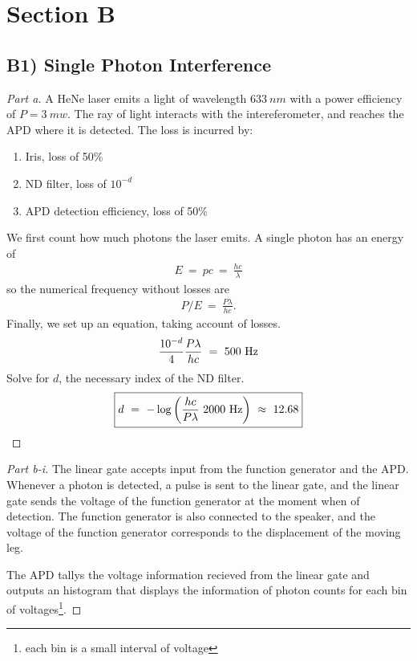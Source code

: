 \documentclass{article}
\numberwithin{equation}{section}
\begin{document}
\section{Section B}
\subsection*{B1) Single Photon Interference}
\begin{proof}
    [Part a] 
    A HeNe laser emits a light of wavelength $633\ nm$ with a power efficiency of 
    $P = 3\ mw$. The ray of light interacts with the intereferometer, 
    and reaches the APD where it is detected. The loss is 
    incurred by: 
    \begin{enumerate}
        \item Iris, loss of 50\% 
        \item ND filter, loss of $10^{-d}$ 
        \item APD detection efficiency, loss of 50\%
    \end{enumerate}

    We first count how much photons the laser emits. A single 
    photon has an energy of 
    \begin{align}
        E \ = \ pc \ = \ \frac {hc} \lambda
    \end{align}
    so the numerical frequency without losses are 
    \begin{align}
        P/E \ = \ \frac {P \lambda}{hc}.
    \end{align}
    Finally, we set up an equation, taking account of losses. 
    \begin{align}
        \frac {10^{-d}}{4} \frac {P \lambda}{hc} \ = \ 500 \ \rm Hz
    \end{align}
    Solve for $d$, the necessary index of the ND filter. 
    \begin{align}
        \boxed{
        d \ = \ -\log\left(
            \frac {hc}{P \lambda} \  2000 \ \rm Hz
        \right) \ \approx \ 12.68
        }
    \end{align}
\end{proof}

\begin{proof}[Part b-i]
    The linear gate accepts input from the 
    function generator and the APD. Whenever a photon is detected, 
    a pulse is sent to the linear gate, and the linear gate 
    sends the voltage of the function generator at the moment when 
    of detection. The function generator is also connected to the speaker, 
    and the voltage of the function generator corresponds to 
    the displacement of the moving leg. 

    The APD tallys the voltage information recieved from the linear 
    gate and outputs an histogram that displays the information 
    of photon counts for each bin of voltages\footnote{each 
    bin is a small interval of voltage}. 
\end{proof}
\end{document}

